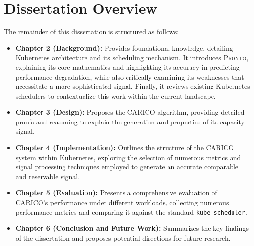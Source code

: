 \section{Dissertation Overview}
The remainder of this dissertation is structured as follows:
\begin{itemize}
    \item \textbf{Chapter 2 (Background):} Provides foundational
        knowledge, detailing Kubernetes architecture and its scheduling
        mechanism. It introduces \textsc{Pronto}, explaining its core
        mathematics and highlighting its accuracy in predicting performance
        degradation, while also critically examining its weaknesses that
        necessitate a more sophisticated signal. Finally, it reviews existing
        Kubernetes schedulers to contextualize this work within the current
        landscape.
    \item \textbf{Chapter 3 (Design):} Proposes the
        \textsc{CARICO} algorithm, providing detailed proofs and reasoning to
        explain the generation and properties of its capacity signal.
    \item \textbf{Chapter 4 (Implementation):} Outlines the
        structure of the \textsc{CARICO} system within Kubernetes, exploring the
        selection of numerous metrics and signal processing techniques employed
        to generate an accurate comparable and reservable signal.
    \item \textbf{Chapter 5 (Evaluation):} Presents a comprehensive
        evaluation of \textsc{CARICO}'s performance under different workloads,
        collecting numerous performance metrics and comparing it against the
        standard \texttt{kube-scheduler}.
    \item \textbf{Chapter 6 (Conclusion and Future Work):} Summarizes the key
        findings of the dissertation and proposes potential directions for
        future research.
\end{itemize}

